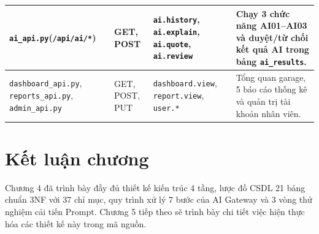 \begin{table}[H]
\begin{tabularx}{\textwidth}{|L{4.0cm}|C{1.8cm}|L{3.1cm}|Y|}
\hline
\texttt{ai\_api.py}\newline(\texttt{/api/ai/*}) & GET, POST & \texttt{ai.history}, \texttt{ai.explain}, \texttt{ai.quote}, \texttt{ai.review} & Chạy 3 chức năng AI01--AI03 và duyệt/từ chối kết quả AI trong bảng \texttt{ai\_results}. \\
\hline
\texttt{dashboard\_api.py}, \texttt{reports\_api.py}, \texttt{admin\_api.py} & GET, POST, PUT & \texttt{dashboard.view}, \texttt{report.view}, \texttt{user.*} & Tổng quan garage, 5 báo cáo thống kê và quản trị tài khoản nhân viên. \\
\hline
\end{tabularx}
\end{table}

\section{Kết luận chương}

Chương 4 đã trình bày đầy đủ thiết kế kiến trúc 4 tầng, lược đồ CSDL 21 bảng chuẩn 3NF với 37 chỉ mục, quy trình xử lý 7 bước của AI Gateway và 3 vòng thử nghiệm cải tiến Prompt. Chương 5 tiếp theo sẽ trình bày chi tiết việc hiện thực hóa các thiết kế này trong mã nguồn.
